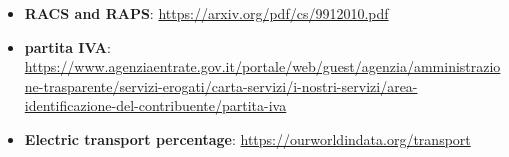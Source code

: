\begin{itemize}
    \item \textbf{\ac{RACS} and \ac{RAPS}}: \url{https://arxiv.org/pdf/cs/9912010.pdf}
    \item \textbf{\gls{partita IVA}}: \url{https://www.agenziaentrate.gov.it/portale/web/guest/agenzia/amministrazione-trasparente/servizi-erogati/carta-servizi/i-nostri-servizi/area-identificazione-del-contribuente/partita-iva}
    \item \textbf{Electric transport percentage}: \url{https://ourworldindata.org/transport}
\end{itemize}
\clearpage